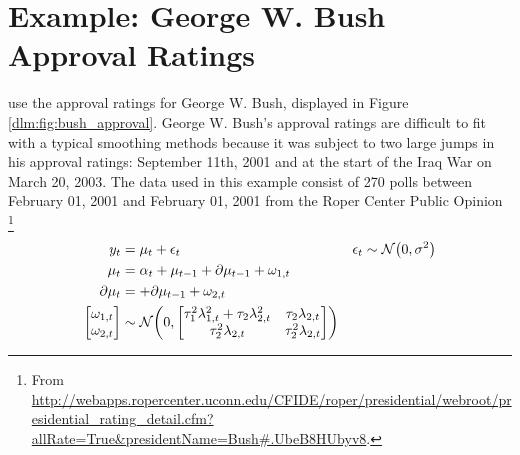 \section{Example: George W. Bush Approval Ratings}
\label{dlm:sec:george-w.-bush}

\textcite{RatkovicEng2010} use the approval ratings for George W. Bush, displayed in Figure \ref{dlm:fig:bush_approval}.
George W. Bush's approval ratings are difficult to fit with a typical smoothing methods because it was subject to two large jumps in his approval ratings: September 11th, 2001 and at the start of the Iraq War on March 20, 2003.
The data used in this example consist of 270 polls between February 01, 2001 and February 01, 2001 from the Roper Center Public Opinion \footnote{From \url{http://webapps.ropercenter.uconn.edu/CFIDE/roper/presidential/webroot/presidential_rating_detail.cfm?allRate=True\&presidentName=Bush\#.UbeB8HUbyv8}.}

\begin{equation}
  \label{dlm:eq:30}
  \begin{aligned}[t]
    y_{t} &= \mu_{t} + \epsilon_{t} & \epsilon_{t} & \sim \mathcal{N}\mathopen{}\left(0, \sigma^{2}\right)\mathclose{} \\
    \mu_{t} &= \alpha_{t} +  \mu_{t - 1} + \partial \mu_{t - 1} + \omega_{1, t} \\
    \partial \mu_{t} &= + \partial \mu_{t - 1} + \omega_{2, t} \\
    \begin{bmatrix}
      \omega_{1, t} \\
      \omega_{2, t}
    \end{bmatrix} &
                    \sim \mathcal{N}\mathopen{}\left(0,
                    \begin{bmatrix}
                      \tau_{1}^{2} \lambda_{1, t}^{2} + \tau_{2} \lambda_{2, t}^{2} & \tau_{2} \lambda_{2, t} \\
                      \tau_{2}^{2} \lambda_{2, t} & \tau_{2}^{2} \lambda_{2, t}
                    \end{bmatrix}
                    \right)\mathclose{}
  \end{aligned}
\end{equation}


